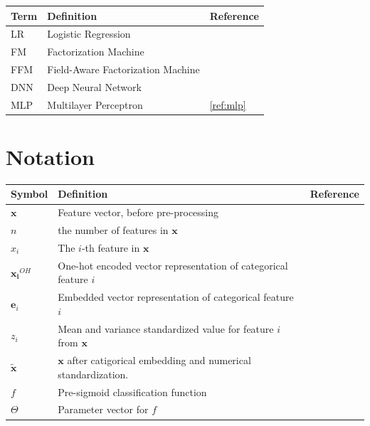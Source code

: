 \documentclass{mldsmsc}
\begin{document}
\begin{table}[ht]
    \begin{tabular}{|l|l|l|}
      \hline
        \textbf{Term} & \textbf{Definition} & \textbf{Reference} \\
      \hline
        LR& Logistic Regression & \\
        FM & Factorization Machine & \\
        FFM & Field-Aware Factorization Machine & \\
        DNN & Deep Neural Network & \\
        MLP & Multilayer Perceptron & \ref{ref:mlp} \\
    \hline
    \end{tabular}
\end{table}


\section{Notation}
\label{app:notation}

\begin{table}[ht]
    \begin{tabular}{|l|l|l|}
      \hline
        \textbf{Symbol} & \textbf{Definition} & \textbf{Reference} \\
      \hline
        $\mathbf{x}$& Feature vector, before pre-processing &\\
        $n$ & the number of features in $\mathbf{x}$ &\\
        $x_i$& The $i$-th feature in $\mathbf{x}$ &\\
        $\mathbf{x_i}^{OH}$ & One-hot encoded vector representation of categorical feature $i$ &\\
        $\mathbf{e}_i$ & Embedded vector representation of categorical feature $i$ & \\
        $z_i$ & Mean and variance standardized value for feature $i$ from $\mathbf{x}$ &\\
        $\tilde{\mathbf{x}}$ & $\mathbf{x}$ after catigorical embedding and numerical standardization. &\\
        $f$ & Pre-sigmoid classification function &\\
        $\Theta$ & Parameter vector for $f$ & \\
    \hline
    \end{tabular}
\end{table}




\end{document}
